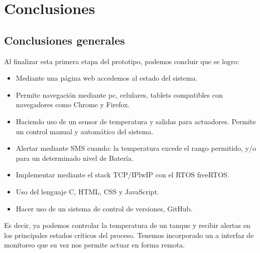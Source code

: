 
\chapter{Conclusiones} %

\label{Chapter5} %




\section{Conclusiones generales }


Al finalizar esta primera etapa del prototipo, podemos concluir que se logro:
  \begin{itemize}
    \item Mediante una página web accedemos al estado del sistema.
    \item Permite navegación mediante pc, celulares, tablets compatibles con navegadores como Chrome y Firefox.
    \item Haciendo uso de un sensor de temperatura y salidas para actuadores. Permite un control manual y automático del sistema.
    \item Alertar mediante SMS cuando: la temperatura excede el rango permitido, y/o para un determinado nivel de Batería.
    \item Implementar mediante el stack TCP/IPlwIP con el RTOS freeRTOS. 
    \item Uso del lenguaje C, HTML, CSS y JavaScript. 
    \item Hacer uso de un sistema de control de versiones, GitHub. 
   \end{itemize} 

Es decir, ya podemos controlar la temperatura de un tanque y recibir alertas en los principales estados críticos del proceso. Tenemos incorporado un a interfaz de monitoreo que su vez nos permite actuar en forma remota.  



